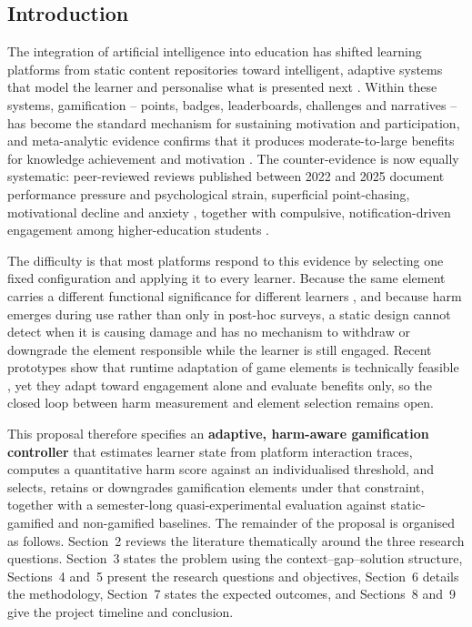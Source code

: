 \documentclass[12pt,a4paper]{article}
\begin{document}
\begin{justify}


\section{Introduction}

The integration of artificial intelligence into education has shifted learning platforms from
static content repositories toward intelligent, adaptive systems that model the learner and
personalise what is presented next \parencite{vistorte2024integrating,naseer2025game}. Within
these systems, gamification -- points, badges, leaderboards, challenges and narratives -- has
become the standard mechanism for sustaining motivation and participation, and meta-analytic
evidence confirms that it produces moderate-to-large benefits for knowledge achievement and
motivation \parencite{lu2024ai}. The counter-evidence is now equally systematic: peer-reviewed
reviews published between 2022 and 2025 document performance pressure and psychological strain,
superficial point-chasing, motivational decline and anxiety \parencite{nugroho2025negative,edwards2022anxiety},
together with compulsive, notification-driven engagement among higher-education students
\parencite{gul2026brainrot}.

The difficulty is that most platforms respond to this evidence by selecting one fixed
configuration and applying it to every learner. Because the same element carries a different
functional significance for different learners \parencite{gao2024sdt}, and because harm emerges
during use rather than only in post-hoc surveys, a static design cannot detect when it is causing
damage and has no mechanism to withdraw or downgrade the element responsible while the learner is
still engaged. Recent prototypes show that runtime adaptation of game elements is technically
feasible \parencite{zourmpakis2023adaptive,shabadurai2025reinforcement}, yet they adapt toward
engagement alone and evaluate benefits only, so the closed loop between harm measurement and
element selection remains open.

This proposal therefore specifies an \textbf{adaptive, harm-aware gamification controller} that
estimates learner state from platform interaction traces, computes a quantitative harm score
against an individualised threshold, and selects, retains or downgrades gamification elements
under that constraint, together with a semester-long quasi-experimental evaluation against
static-gamified and non-gamified baselines. The remainder of the proposal is organised as follows.
Section~2 reviews the literature thematically around the three research questions. Section~3 states
the problem using the context--gap--solution structure, Sections~4 and~5 present the research
questions and objectives, Section~6 details the methodology, Section~7 states the expected
outcomes, and Sections~8 and~9 give the project timeline and conclusion.



\end{justify}
\end{document}
